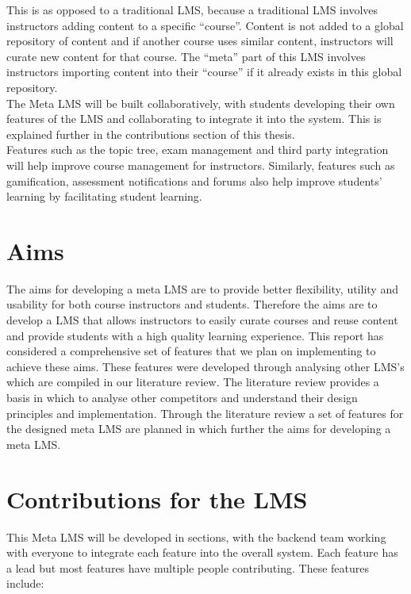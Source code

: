 This is as opposed to a traditional LMS, because a traditional LMS involves instructors adding content to a specific ``course''. Content is not added to a global repository of content and if another course uses similar content, instructors will curate new content for that course. The ``meta'' part of this LMS involves instructors importing content into their ``course'' if it already exists in this global repository.\\

The Meta LMS will be built collaboratively, with students developing their own features of the LMS and collaborating to integrate it into the system. This is explained further in the contributions section of this thesis. \\
Features such as the topic tree, exam management and third party integration will help improve course management for instructors. Similarly, features such as gamification, assessment notifications and forums also help improve students' learning by facilitating student learning.\\

\section{Aims}
The aims for developing a meta LMS are to provide better flexibility, utility and usability for both course instructors and students. 
Therefore the aims are to develop a LMS that allows instructors to easily curate courses and reuse content and provide students with a high quality learning experience. 
This report has considered a comprehensive set of features that we plan on implementing to achieve these aims. 
These features were developed through analysing other LMS’s which are compiled in our literature review.
The literature review provides a basis in which to analyse other competitors and understand their design principles and implementation.
Through the literature review a set of features for the designed meta LMS are planned in which further the aims for developing a meta LMS.

\section{Contributions for the LMS}
This Meta LMS will be developed in sections, with the backend team working with everyone to integrate each feature into the overall system. Each feature has a lead but most features have multiple people contributing. These features include:

